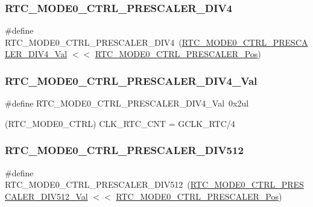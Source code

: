 \subsubsection{\texorpdfstring{RTC\_MODE0\_CTRL\_PRESCALER\_DIV4}{RTC\_MODE0\_CTRL\_PRESCALER\_DIV4}}
{\footnotesize\ttfamily \#define R\+T\+C\+\_\+\+M\+O\+D\+E0\+\_\+\+C\+T\+R\+L\+\_\+\+P\+R\+E\+S\+C\+A\+L\+E\+R\+\_\+\+D\+I\+V4~(\mbox{\hyperlink{group___s_a_m_d21___r_t_c_ga23ddb56c7b7ab407e943449a261d904b}{R\+T\+C\+\_\+\+M\+O\+D\+E0\+\_\+\+C\+T\+R\+L\+\_\+\+P\+R\+E\+S\+C\+A\+L\+E\+R\+\_\+\+D\+I\+V4\+\_\+\+Val}} $<$$<$ \mbox{\hyperlink{group___s_a_m_d21___r_t_c_gae6a98daefadfa386b8f37022a707044e}{R\+T\+C\+\_\+\+M\+O\+D\+E0\+\_\+\+C\+T\+R\+L\+\_\+\+P\+R\+E\+S\+C\+A\+L\+E\+R\+\_\+\+Pos}})}

\mbox{\label{group___s_a_m_d21___r_t_c_ga23ddb56c7b7ab407e943449a261d904b}} 
\subsubsection{\texorpdfstring{RTC\_MODE0\_CTRL\_PRESCALER\_DIV4\_Val}{RTC\_MODE0\_CTRL\_PRESCALER\_DIV4\_Val}}
{\footnotesize\ttfamily \#define R\+T\+C\+\_\+\+M\+O\+D\+E0\+\_\+\+C\+T\+R\+L\+\_\+\+P\+R\+E\+S\+C\+A\+L\+E\+R\+\_\+\+D\+I\+V4\+\_\+\+Val~0x2ul}



(R\+T\+C\+\_\+\+M\+O\+D\+E0\+\_\+\+C\+T\+RL) C\+L\+K\+\_\+\+R\+T\+C\+\_\+\+C\+NT = G\+C\+L\+K\+\_\+\+R\+T\+C/4 

\mbox{\label{group___s_a_m_d21___r_t_c_gac8812e946ef1b003a2045736043b1860}} 
\subsubsection{\texorpdfstring{RTC\_MODE0\_CTRL\_PRESCALER\_DIV512}{RTC\_MODE0\_CTRL\_PRESCALER\_DIV512}}
{\footnotesize\ttfamily \#define R\+T\+C\+\_\+\+M\+O\+D\+E0\+\_\+\+C\+T\+R\+L\+\_\+\+P\+R\+E\+S\+C\+A\+L\+E\+R\+\_\+\+D\+I\+V512~(\mbox{\hyperlink{group___s_a_m_d21___r_t_c_ga7bb0d53dbe87b701a52631ce6f3d302d}{R\+T\+C\+\_\+\+M\+O\+D\+E0\+\_\+\+C\+T\+R\+L\+\_\+\+P\+R\+E\+S\+C\+A\+L\+E\+R\+\_\+\+D\+I\+V512\+\_\+\+Val}} $<$$<$ \mbox{\hyperlink{group___s_a_m_d21___r_t_c_gae6a98daefadfa386b8f37022a707044e}{R\+T\+C\+\_\+\+M\+O\+D\+E0\+\_\+\+C\+T\+R\+L\+\_\+\+P\+R\+E\+S\+C\+A\+L\+E\+R\+\_\+\+Pos}})}

